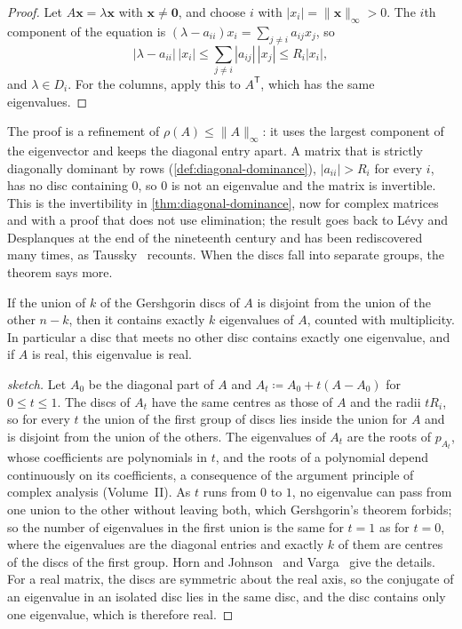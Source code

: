 \begin{proof}
Let $A\mathbf x=\lambda\mathbf x$ with $\mathbf x\ne\mathbf 0$, and choose $i$ with $|x_i|=\|\mathbf x\|_\infty>0$. The $i$th component of the equation is $(\lambda-a_{ii})x_i=\sum_{j\ne i}a_{ij}x_j$, so
\[
|\lambda-a_{ii}|\,|x_i|\le\sum_{j\ne i}|a_{ij}|\,|x_j|\le R_i|x_i| ,
\]
and $\lambda\in D_i$. For the columns, apply this to $A^{\mathsf T}$, which has the same eigenvalues.
\end{proof}

The proof is a refinement of $\rho(A)\le\|A\|_\infty$: it uses the largest component of the eigenvector and keeps the diagonal entry apart. A matrix that is strictly diagonally dominant by rows (\cref{def:diagonal-dominance}), $|a_{ii}|>R_i$ for every $i$, has no disc containing $0$, so $0$ is not an eigenvalue and the matrix is invertible. This is the invertibility in \cref{thm:diagonal-dominance}, now for complex matrices and with a proof that does not use elimination; the result goes back to L\'evy and Desplanques at the end of the nineteenth century and has been rediscovered many times, as Taussky~\cite{taussky1949} recounts. When the discs fall into separate groups, the theorem says more.

\begin{theorem}
\label{thm:gershgorin-separated}
If the union of $k$ of the Gershgorin discs of $A$ is disjoint from the union of the other $n-k$, then it contains exactly $k$ eigenvalues of $A$, counted with multiplicity. In particular a disc that meets no other disc contains exactly one eigenvalue, and if $A$ is real, this eigenvalue is real.
\end{theorem}

\begin{proof}[sketch]
Let $A_0$ be the diagonal part of $A$ and $A_t\coloneqq A_0+t(A-A_0)$ for $0\le t\le1$. The discs of $A_t$ have the same centres as those of $A$ and the radii $tR_i$, so for every $t$ the union of the first group of discs lies inside the union for $A$ and is disjoint from the union of the others. The eigenvalues of $A_t$ are the roots of $p_{A_t}$, whose coefficients are polynomials in $t$, and the roots of a polynomial depend continuously on its coefficients, a consequence of the argument principle of complex analysis (Volume~II). As $t$ runs from $0$ to $1$, no eigenvalue can pass from one union to the other without leaving both, which Gershgorin's theorem forbids; so the number of eigenvalues in the first union is the same for $t=1$ as for $t=0$, where the eigenvalues are the diagonal entries and exactly $k$ of them are centres of the discs of the first group. Horn and Johnson~\cite[Sect.~6.1]{horn2013} and Varga~\cite{varga2004} give the details. For a real matrix, the discs are symmetric about the real axis, so the conjugate of an eigenvalue in an isolated disc lies in the same disc, and the disc contains only one eigenvalue, which is therefore real.
\end{proof}

